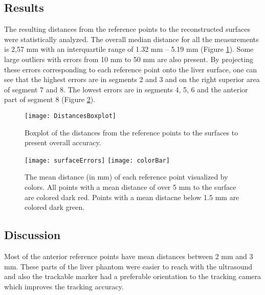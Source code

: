 \subsection{Results}
The resulting distances from the reference points to the reconstructed surfaces
were statistically analyzed.
The overall median distance for all the measurements is 2,57 mm with an
interquartile range of 1.32 mm – 5.19 mm (Figure \ref{fig:surfaceDistances}).
Some large outliers with errors from 10 mm to 50 mm are also present. By projecting these errors corresponding to
each reference point onto the liver surface, one can see that the highest errors
are in segments 2 and 3 and on the right superior area of segment 7 and 8. The
lowest errors are in segments 4, 5, 6 and the anterior part of segment 8 (Figure \ref{fig:surfaceErrors}).
\begin{figure}[H]
  \centering
 \texttt{[image: DistancesBoxplot]}
 \caption{Boxplot of the distances from the reference points to the surfaces to present overall accuracy.}
  \label{fig:surfaceDistances}
\end{figure}

\begin{figure}[H]
  \centering
 \texttt{[image: surfaceErrors]}
  \endminipage
  \hfill
 \texttt{[image: colorBar]}
  \endminipage
  \hfill
 \caption{The mean distance (in mm) of each reference point visualized by colors. All
   points with a mean distance of over 5 mm to the surface are colored dark red.
   Points with a mean distacne below 1.5 mm are colored dark green.}
  \label{fig:surfaceErrors}
\end{figure}


\subsection{Discussion}
Most of the anterior reference points have mean distances between 2 mm and 3 mm.
These parts of the liver phantom were easier to reach with the ultrasound and
also the trackable marker had a preferable orientation to the tracking camera
which improves the tracking accuracy.

